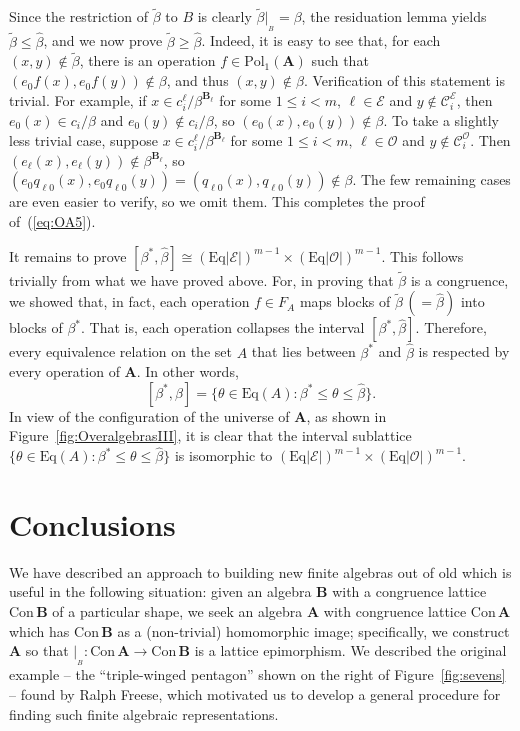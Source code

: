 \documentclass[cm,dissertation]{uhthesis}
\theoremstyle{plain}
\theoremstyle{definition}
\theoremstyle{remark}
\numberwithin{theorem}{section}
\numberwithin{claim}{chapter}
\numberwithin{equation}{section}
\numberwithin{conjecture}{chapter}
\newcommand{\<}{\ensuremath{\langle}}
\renewcommand{\>}{\ensuremath{\rangle}}
\renewcommand{\leq}{\ensuremath{\leqslant}}
\renewcommand{\geq}{\ensuremath{\geqslant}}
\newcommand{\Eq}{\ensuremath{\mathrm{Eq}}}
\newcommand{\Con}{\ensuremath{\mathrm{Con\,}}}
\newcommand{\Pol}{\ensuremath{\mathrm{Pol}}}
\newcommand{\0}{\ensuremath{\mathbf{0}}}
\newcommand{\1}{\ensuremath{\mathbf{1}}}
\newcommand{\2}{\ensuremath{\mathbf{2}}}
\newcommand{\3}{\ensuremath{\mathbf{3}}}
\newcommand{\4}{\ensuremath{\mathbf{4}}}
\newcommand{\5}{\ensuremath{\mathbf{5}}}
\newcommand{\bA}{\ensuremath{\mathbf{A}}}
\newcommand{\bB}{\ensuremath{\mathbf{B}}}
\newcommand{\sC}{\ensuremath{\mathscr{C}}}
\newcommand{\sE}{\ensuremath{\mathscr{E}}}
\newcommand{\sO}{\ensuremath{\mathscr{O}}}
\newcommand{\resB}{\ensuremath{|_{_B}}}
\newcommand{\tbeta}{\ensuremath{\widetilde{\beta}}}
\newcommand{\hbeta}{\ensuremath{\widehat{\beta}}}
\newcommand{\CE}{\ensuremath{\sC_i^{\sE}}}
\newcommand{\CO}{\ensuremath{\sC_i^{\sO}}}
\begin{document}
Since the
restriction of $\tbeta$ to $B$ is clearly $\tbeta \resB = \beta$, the
residuation lemma yields $\tbeta \leq \hbeta$, and we now prove
$\tbeta \geq \hbeta$.  Indeed, it is easy to see that, for each $(x,y)\notin
\tbeta$, there is an operation $f\in \Pol_1(\bA)$ such that $(e_0f(x),
e_0f(y))\notin \beta$, and thus $(x,y)\notin \hbeta$.  Verification of this
statement is trivial.  For example, if 
$x\in c_i^\ell/\beta^{\bB_\ell}$ 
for some $1\leq i < m, \, \ell \in \sE$
and $y\notin \CE$, then $e_0(x) \in c_i/\beta$ and $e_0(y)\notin c_i/\beta$,
so 
$(e_0(x), e_0(y))\notin \beta$.  To take a slightly less trivial case, suppose 
$x\in c_i^\ell/\beta^{\bB_\ell}$ 
for some $1\leq i < m, \, \ell \in \sO$
and $y\notin \CO$.  Then $(e_{\ell}(x), e_{\ell}(y))\notin \beta^{\bB_\ell}$,
so $(e_0q_{\ell 0}(x), e_0q_{\ell 0}(y)) = (q_{\ell 0}(x), q_{\ell 0}(y)) \notin
\beta$.  The few remaining cases are even easier to verify, so we omit them.
This completes the proof of~(\ref{eq:OA5}).

It remains to prove
$[\beta^*, \widehat{\beta}] \cong (\Eq|\sE|)^{m-1} \times (\Eq|\sO|)^{m-1}$. 
This follows trivially from what we have proved above.  For,
in proving that $\tbeta$ is a congruence, we showed that, in fact, each
operation $f\in F_A$ maps blocks of $\tbeta \, (= \hbeta)$ into blocks of $\beta^*$.  That is,
each operation collapses the interval $[\beta^*, \hbeta]$.  Therefore, every
equivalence relation on the set $A$ that lies between $\beta^*$ and $\hbeta$ is
respected by every operation of $\bA$. In other words,
\[
  [\beta^*, \hbeta] = \{\theta \in \Eq(A): \beta^* \leq \theta \leq \hbeta\}.
  \]
  In view of the configuration of the universe of $\bA$, 
  as shown in Figure~\ref{fig:OveralgebrasIII},
  it is clear that the interval sublattice 
  $\{\theta \in \Eq(A): \beta^* \leq \theta \leq \hbeta\}$
  is isomorphic to $(\Eq|\sE|)^{m-1} \times (\Eq|\sO|)^{m-1}$. 
  \hfill \qedsymbol

  \section{Conclusions}
  We have described an approach to building new finite algebras out of old
  which is useful in the following situation: given an algebra $\bB$ with a
  congruence lattice $\Con \bB$ of a particular shape, we seek an algebra
  $\bA$ with congruence lattice $\Con \bA$ which has $\Con \bB$ as a
  (non-trivial) homomorphic image; specifically, we construct
  $\bA$ so that $\resB : \Con \bA \rightarrow \Con \bB$ is a lattice epimorphism.
  We described the original example -- the ``triple-winged pentagon'' shown on
  the right of Figure~\ref{fig:sevens} -- found by 
%
Ralph Freese, which 
  motivated us to develop a general procedure for finding such finite algebraic
  representations.
\end{document}
